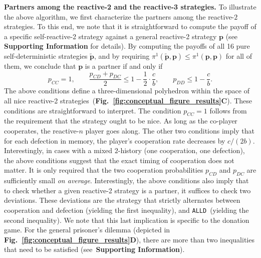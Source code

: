 \documentclass[11pt]{article}
\newcommand{\figref}[1]{{\textbf{Fig.~\ref{#1}}}}
\def\alld{\texttt{ALLD}}
\def\SI{\textbf{Supporting Information}}
\begin{document}
\noindent
\textbf{Partners among the reactive-2 and the reactive-3 strategies.}
To illustrate the above algorithm, we first characterize the partners among the reactive-$2$ strategies. 
To this end, we note that it is straightforward to compute the payoff of a specific self-reactive-2 strategy against a general reactive-2 strategy $\mathbf{p}$ (see \SI{} for details). 
By computing the payoffs of all 16 pure self-deterministic strategies $\mathbf{\tilde p}$, and by requiring $\pi^1(\mathbf{\tilde p},\mathbf{p}) \!\le\! \pi^1(\mathbf{p},\mathbf{p})$ for all of them, we conclude that $\mathbf{p}$ is a partner if and only if
\begin{equation}\label{eq:two_bit_conditions}
  p_{CC} = 1, \qquad  \frac{p_{CD} + p_{DC}}{2} \le 1 - \frac{1}{2} \!\cdot\! \frac{c}{b}, \qquad  p_{DD} \leq 1\!-\! \frac{c}{b}.
\end{equation}
The above conditions define a three-dimensional polyhedron within the space of all nice reactive-2 strategies~(\figref{fig:conceptual_figure_results}\textbf{C}).
These conditions are straightforward to interpret. 
The condition $p_{CC}\!=\!1$ follows from the requirement that the strategy ought to be nice. 
As long as the co-player cooperates, the reactive-$n$ player goes along. 
The other two conditions imply that for each defection in memory, the player's cooperation rate decreases by $c/(2b)$.
Interestingly, in cases with a mixed $2$-history (one cooperation, one defection), the above conditions suggest that the exact timing of cooperation does not matter. 
It is only required that the two cooperation probabilities $p_{CD}$ and $p_{DC}$ are sufficiently small {\it on average}. 
Interestingly, the above conditions also imply that to check whether a given reactive-2 strategy is a partner, it suffices to check two deviations. 
These deviations are the strategy that strictly alternates between cooperation and defection (yielding the first inequality), and \alld~(yielding the second inequality). 
We note that this last implication is specific to the donation game. 
For the general prisoner's dilemma (depicted in \figref{fig:conceptual_figure_results}\textbf{D}), there are more than two inequalities that need to be satisfied (see~\SI{}).
\end{document}
